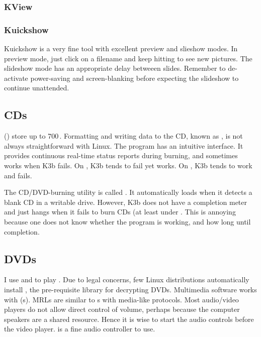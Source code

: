 \documentclass[12pt,twoside]{article}
\begin{document}
\subsubsection{KView}\label{sxn:kview}
\subsubsection{Kuickshow}\label{sxn:kuickshow}
Kuickshow is a very fine tool with excellent preview and slieshow
modes.
In preview mode, just click on a filename and keep hitting 
 to see new pictures.
The slideshow mode has an appropriate delay betweeen slides.
Remember to de-activate power-saving and screen-blanking before
expecting the slideshow to continue unattended.

\subsection{CDs}\label{sxn:cd}
 () store up to 700\,\MB.
Formatting and writing data to the CD, known as , is
not always straightforward with Linux.
The program  has an intuitive interface.
It provides continuous real-time status reports during burning, and
sometimes works when K3b fails.
On , K3b tends to fail yet
 works. 
On , K3b tends to work and 
 fails. 

The  CD/DVD-burning utility is called .
It automatically loads when it detects a blank CD in a writable drive.
However, K3b does not have a completion meter and just hangs when it
fails to burn CDs (at least under .  
This is annoying because one does not know whether the program is
working, and how long until completion.

\subsection{DVDs}\label{sxn:dvd}
I use  and  to play .
Due to legal concerns, few Linux distributions automatically install
, the pre-requisite library for decrypting DVDs.
Multimedia software works with 
(s). 
MRLs are similar to s with media-like protocols.
Most audio/video players do not allow direct control of volume,
perhaps because the computer speakers are a shared resource.
Hence it is wise to start the audio controls before the video player.
 is a fine audio controller to use.
\end{document}
